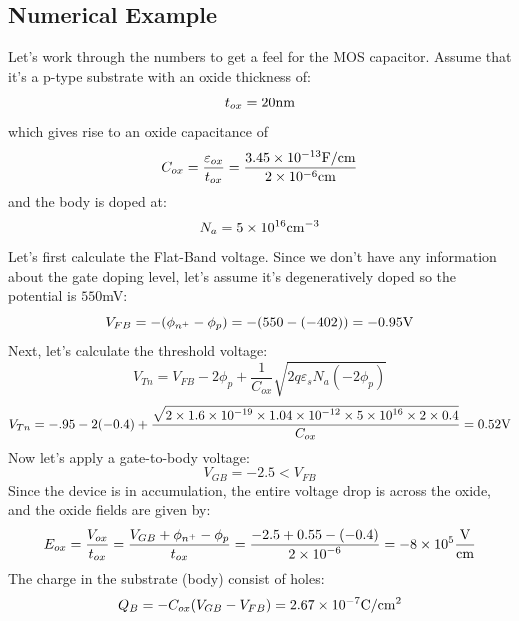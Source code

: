 \subsection{Numerical Example}
Let's work through the numbers to get a feel for the  MOS capacitor.   Assume that it's a  p-type substrate with an oxide thickness of:
\begin{equation}
{t_{ox}} = 20{\rm{nm}}
\end{equation}
which gives rise to an oxide capacitance of 
\begin{equation}
{C_{ox}} = \frac{{{\varepsilon _{ox}}}}{{{t_{ox}}}} = \frac{{3.45 \times {{10}^{ - 13}}{\rm{F/cm}}}}{{{\rm{2}} \times {\rm{1}}{{\rm{0}}^{{\rm{ - 6}}}}{\rm{cm}}}}
\end{equation}
and the body is doped at:
\begin{equation}
{N_a} = 5 \times {10^{16}}{\rm{c}}{{\rm{m}}^{ - 3}}
\end{equation}
Let's first calculate the Flat-Band voltage.  Since we don't have any information about the gate doping level, let's assume it's degeneratively doped so the potential is $550$mV:
\begin{equation}
{V_{FB}} =  - ({\phi _{{n^ + }}} - {\phi _p}) =  - (550 - ( - 402)) =  - 0.95{\rm{V}}
\end{equation}
Next, let's calculate the threshold voltage:
\begin{equation}
{V_{Tn}} = {V_{FB}} - 2{\phi _p} + \frac{1}{{{C_{ox}}}}\sqrt {2q{\varepsilon _s}{N_a}( - 2{\phi _p})} 
\end{equation}
\begin{equation}
{V_{Tn}} =  - .95 - 2( - 0.4) + \frac{{\sqrt {2 \times 1.6 \times {{10}^{ - 19}} \times 1.04 \times {{10}^{ - 12}} \times 5 \times {{10}^{16}} \times 2 \times 0.4} }}{{{C_{ox}}}} = 0.52{\rm{V}}
\end{equation}
Now let's apply a gate-to-body voltage:
\begin{equation}
{V_{GB}} =  - 2.5 < {V_{FB}}
\end{equation}
Since the device is in accumulation, the entire voltage drop is across the oxide, and the oxide fields are given by:
\begin{equation}
{E_{ox}} = \frac{{{V_{ox}}}}{{{t_{ox}}}} = \frac{{{V_{GB}} + {\phi _{{n^ + }}} - {\phi _p}}}{{{t_{ox}}}} = \frac{{ - 2.5 + 0.55 - ( - 0.4)}}{{2 \times {{10}^{ - 6}}}} =  - 8 \times {10^5}\frac{{\rm{V}}}{{{\rm{cm}}}}
\end{equation}
The charge in the substrate (body) consist of holes:
\begin{equation}
{Q_B} =  - {C_{ox}}({V_{GB}} - {V_{FB}}) = 2.67 \times {10^{ - 7}}{\rm{C/c}}{{\rm{m}}^{\rm{2}}}
\end{equation}
